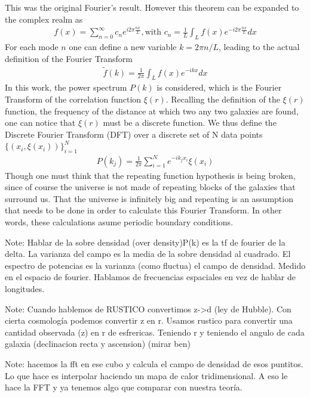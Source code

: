 This was the original Fourier's result. However this theorem can be expanded to the complex realm as 
\begin{align}
	f(x) = \sum_{n=0}^{\infty} c_n e^{i 2\pi \frac{nx}{L}}, \text{with } c_n = \frac{1}{L}\int_{L}^{} f(x) e^{-i 2\pi \frac{nx}{L}}dx 
\end{align}
For each mode $n$ one can define a new variable $k=2\pi n /L$, leading to the actual definition of the Fourier Transform 
\begin{align}
	\tilde{f}(k) = \frac{1}{2\pi}\int_{L}^{}  f(x) e^{-i k x} dx
\end{align}
In this work, the power spectrum $P(k)$ is considered, which is the Fourier Transform of the correlation function $\xi(r)$.  Recalling the definition of the $\xi(r)$ function, the frequency of the distance at which two any two galaxies are found, one can notice that  $\xi(r)$ must be a discrete function. We thus define the Discrete Fourier Transform (DFT) over a discrete set of N data points $\{\left( x_i, \xi(x_i) \right) \}_{i=1}^{N} $
\begin{align}
	P(k_j) = \frac{1}{2\pi}\sum_{i=1}^{N} e^{-i k_j x_{i}} \xi(x_i)
	\label{eq:DFT}
\end{align}
Though one must think that the repeating function hypothesis is being broken, since of course the universe is not made of repeating blocks of the galaxies that surround us. That the universe is infinitely big and repeating is an assumption that needs to be done in order to calculate this Fourier Transform. In other words, these calculations asume periodic boundary conditions.

Note: Hablar de la sobre densidad (over density)P(k) es la tf de fourier de la delta. La varianza del campo es la media de la sobre densidad al cuadrado. El espectro de potencias es la varianza (como fluctua) el campo de densidad. Medido en el espacio de fourier. Hablamos de  frecuencias espaciales en vez de hablar de longitudes.

Note: Cuando hablemos de RUSTICO convertimos z->d (ley de Hubble). Con cierta cosmología podemos convertir z en r. Usamos rustico para convertir una cantidad observada (z) en r de esfrericas. Teniendo r y teniendo el angulo de cada galaxia (declinacion recta y ascension) (mirar ben) 

Note: hacemos la fft en ese cubo y calcula el campo de densidad de esos puntitos. Lo que hace es interpolar haciendo un mapa de calor tridimensional. A eso le hace la FFT y ya tenemos algo que comparar con nuestra teoría.

